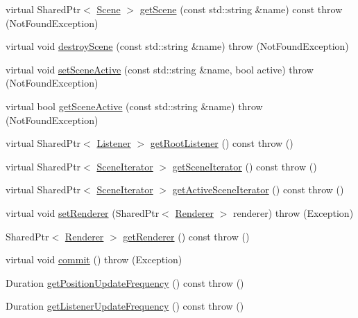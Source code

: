 \begin{DoxyCompactItemize}
\item 
virtual Shared\+Ptr$<$ \hyperlink{classAudio_1_1Scene}{Scene} $>$ \hyperlink{classAudio_1_1SceneManager_a04610dd845d101afe1d853b5cd5739f8}{get\+Scene} (const std\+::string \&name) const   throw (\+Not\+Found\+Exception)
\item 
virtual void \hyperlink{classAudio_1_1SceneManager_add7f10ae5fb919395eed00d9d98e669e}{destroy\+Scene} (const std\+::string \&name)  throw (\+Not\+Found\+Exception)
\item 
virtual void \hyperlink{classAudio_1_1SceneManager_aa54f976c881d00cec911ac9808ddc79b}{set\+Scene\+Active} (const std\+::string \&name, bool active)  throw (\+Not\+Found\+Exception)
\item 
virtual bool \hyperlink{classAudio_1_1SceneManager_a09ccc3612c3cda11793e6f2afcf4d868}{get\+Scene\+Active} (const std\+::string \&name)  throw (\+Not\+Found\+Exception)
\item 
virtual Shared\+Ptr$<$ \hyperlink{classAudio_1_1Listener}{Listener} $>$ \hyperlink{classAudio_1_1SceneManager_a097361efc640f247e42166d943732e21}{get\+Root\+Listener} () const   throw ()
\item 
virtual Shared\+Ptr$<$ \hyperlink{classAudio_1_1VirtualIterator}{Scene\+Iterator} $>$ \hyperlink{classAudio_1_1SceneManager_afec483c92d363fee4d4e9d07e1ccda0c}{get\+Scene\+Iterator} () const   throw ()
\item 
virtual Shared\+Ptr$<$ \hyperlink{classAudio_1_1VirtualIterator}{Scene\+Iterator} $>$ \hyperlink{classAudio_1_1SceneManager_a44690f188696bbf8858bc1884fecffc8}{get\+Active\+Scene\+Iterator} () const   throw ()
\item 
virtual void \hyperlink{classAudio_1_1SceneManager_af0b6be5991524faad6f04479ef6c6de8}{set\+Renderer} (Shared\+Ptr$<$ \hyperlink{classAudio_1_1Renderer}{Renderer} $>$ renderer)  throw (\+Exception)
\item 
Shared\+Ptr$<$ \hyperlink{classAudio_1_1Renderer}{Renderer} $>$ \hyperlink{classAudio_1_1SceneManager_a624e4c54299b2095026bc285da4611f2}{get\+Renderer} () const   throw ()
\item 
virtual void \hyperlink{classAudio_1_1SceneManager_a96b8beedf8b29dfa45f653731a692b2c}{commit} ()  throw (\+Exception)
\item 
Duration \hyperlink{classAudio_1_1SceneManager_a8bb48bf2e4cdf4a0888bab459b7d6fd0}{get\+Position\+Update\+Frequency} () const   throw ()
\item 
Duration \hyperlink{classAudio_1_1SceneManager_ae781580dc33115338d46f080dc7fbb8e}{get\+Listener\+Update\+Frequency} () const   throw ()

\end{DoxyCompactItemize}
